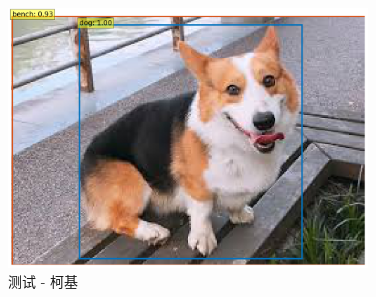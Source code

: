 \begin{figure}[htb]
\centering 
\includegraphics[width=0.85\textwidth]{img/c4d5.png} 
\caption{测试 - 柯基}
\label{Test}
\end{figure}